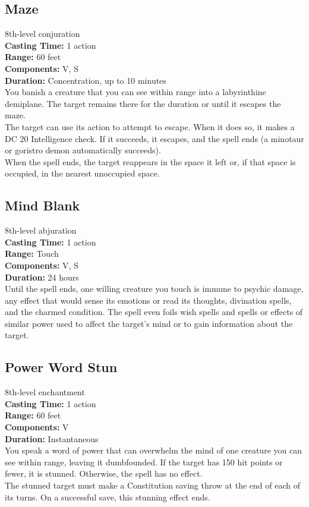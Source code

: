 \documentclass[11pt, A4paper, english]{article}
\begin{document}
		\subsection{Maze}
8th-level conjuration \\
\textbf{Casting Time:} 1 action \\
\textbf{Range:} 60 feet \\
\textbf{Components:} V, S \\
\textbf{Duration:} Concentration, up to 10 minutes \\
You banish a creature that you can see within range into a labyrinthine demiplane. The target remains there for the duration or until it escapes the maze. \\
The target can use its action to attempt to escape. When it does so, it makes a DC 20 Intelligence check. If it succeeds, it escapes, and the spell ends (a minotaur or goristro demon automatically succeeds). \\
When the spell ends, the target reappears in the space it left or, if that space is occupied, in the nearest unoccupied space.

		\subsection{Mind Blank}
8th-level abjuration \\
\textbf{Casting Time:} 1 action \\
\textbf{Range:} Touch \\
\textbf{Components:} V, S \\
\textbf{Duration:} 24 hours \\
Until the spell ends, one willing creature you touch is immune to psychic damage, any effect that would sense its emotions or read its thoughts, divination spells, and the charmed condition. The spell even foils wish spells and spells or effects of similar power used to affect the target’s mind or to gain information about the target.

		\subsection{Power Word Stun}
8th-level enchantment \\
\textbf{Casting Time:} 1 action \\
\textbf{Range:} 60 feet \\
\textbf{Components:} V \\
\textbf{Duration:} Instantaneous \\
You speak a word of power that can overwhelm the mind of one creature you can see within range, leaving it dumbfounded. If the target has 150 hit points or fewer, it is stunned. Otherwise, the spell has no effect. \\
The stunned target must make a Constitution saving throw at the end of each of its turns. On a successful save, this stunning effect ends.
\end{document}
